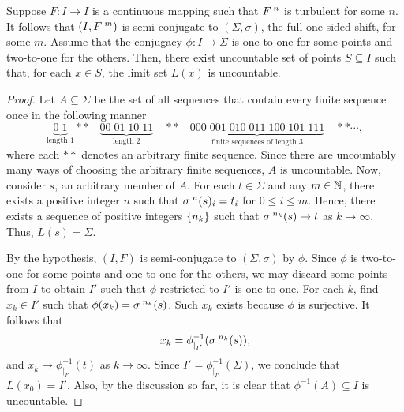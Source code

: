 \documentclass[10pt,twoside]{book}
\begin{document}
\begin{proposition}
  Suppose $F: I \to I$ is a continuous mapping such that $F^{\;n}$ is turbulent for some $n$.
  It follows that $(I, F^{\;m})$ is semi-conjugate to $(\Sigma, \sigma)$, the full one-sided shift, for some $m$.
  Assume that the conjugacy $\phi: I \to \Sigma$ is one-to-one for some points and two-to-one for the others.
  Then, there exist uncountable set of points $S \subseteq I$ such that, for each $x \in S$, the limit set $L(x)$ is uncountable.
  \begin{proof}
    Let $A \subseteq \Sigma$ be the set of all sequences that contain every finite sequence once in the following manner
    \begin{equation*}
      \underbrace{0\; 1}_{\mbox{length 1}} **\quad \underbrace{00\; 01\; 10\; 11}_{\mbox{length 2}} \quad**\quad \underbrace{000\; 001\; 010\; 011\; 100\; 101\; 111}_{\mbox{finite sequences of length 3}} \quad** \cdots,
    \end{equation*}
    where each $**$ denotes an arbitrary finite sequence.
    Since there are uncountably many ways of choosing the arbitrary finite sequences, $A$ is uncountable.
    Now, consider $s$, an arbitrary member of $A$.
    For each $t \in \Sigma$ and any $m \in \mathbb{N}$, there exists a positive integer $n$ such that $\sigma^{\;n}(s)_i = t_i$ for $0 \leq i \leq m$.
    Hence, there exists a sequence of positive integers $\left \{ n_k \right \}$ such that $\sigma^{\;n_k}(s) \to t$ as $k \to \infty$.
    Thus, $L(s) = \Sigma$.

    By the hypothesis, $(I, F)$ is semi-conjugate to $(\Sigma, \sigma)$ by $\phi$.
    Since $\phi$ is two-to-one for some points and one-to-one for the others, we may discard some points from $I$ to obtain $I'$ such that $\phi$ restricted to $I'$ is one-to-one.
    For each $k$, find $x_k \in I'$ such that $\phi(x_k) = \sigma^{\;n_k}(s)$.
    Such $x_k$ exists because $\phi$ is surjective.
    It follows that
    \begin{equation*}
      x_k = \phi_{|_{I'}}^{-1}(\sigma^{\;n_k}(s)),
    \end{equation*}
    and $x_k \to \phi_{|_{I'}}^{-1}(t)$ as $k \to \infty$.
    Since $I' = \phi_{|_{I'}}^{-1}(\Sigma)$, we conclude that $L(x_0) = I'$.
    Also, by the discussion so far, it is clear that $\phi^{-1}(A) \subseteq I$ is uncountable.
  \end{proof}
\end{proposition}
\end{document}
